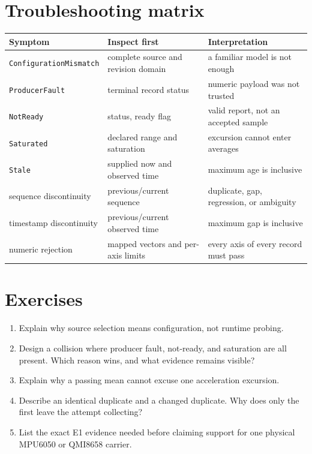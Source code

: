\documentclass[10pt]{article}
\begin{document}
\section{Troubleshooting matrix}
\begin{tabularx}{\linewidth}{@{}l X X@{}}
\toprule
Symptom & Inspect first & Interpretation\\
\midrule
\texttt{ConfigurationMismatch} & complete source and revision domain & a familiar model is not enough\\
\texttt{ProducerFault} & terminal record status & numeric payload was not trusted\\
\texttt{NotReady} & status, ready flag & valid report, not an accepted sample\\
\texttt{Saturated} & declared range and saturation & excursion cannot enter averages\\
\texttt{Stale} & supplied now and observed time & maximum age is inclusive\\
sequence discontinuity & previous/current sequence & duplicate, gap, regression, or ambiguity\\
timestamp discontinuity & previous/current observed time & maximum gap is inclusive\\
numeric rejection & mapped vectors and per-axis limits & every axis of every record must pass\\
\bottomrule
\end{tabularx}

\section{Exercises}
\begin{enumerate}
 \item Explain why source selection means configuration, not runtime probing.
 \item Design a collision where producer fault, not-ready, and saturation are
       all present. Which reason wins, and what evidence remains visible?
 \item Explain why a passing mean cannot excuse one acceleration excursion.
 \item Describe an identical duplicate and a changed duplicate. Why does only
       the first leave the attempt collecting?
 \item List the exact E1 evidence needed before claiming support for one
       physical MPU6050 or QMI8658 carrier.
\end{enumerate}
\end{document}
